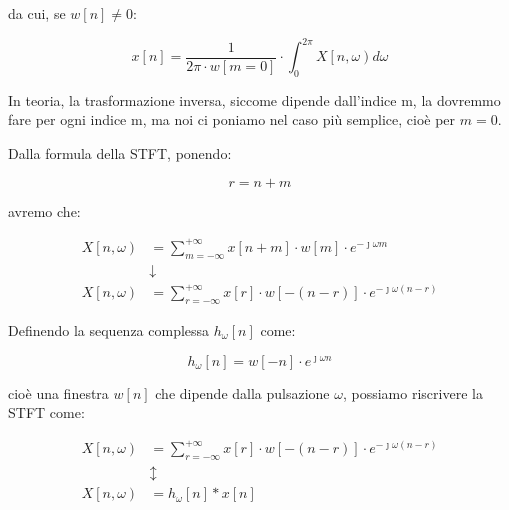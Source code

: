 da cui, se $w \left[ n\right] \neq 0$: 

{
    \Large 
    \begin{equation}
        x \left[ n\right]
        = 
        \dfrac{1}{2 \pi \cdot w \left[ m = 0\right]}
        \cdot 
        \int_{0}^{2 \pi}
        X \left[ n, \omega\right) d \omega
    \end{equation}
}

\begin{tcolorbox}
In teoria, la trasformazione inversa, siccome dipende dall'indice m, la dovremmo fare per ogni indice m, 
ma noi ci poniamo nel caso più semplice, cioè per $m = 0$.     
\end{tcolorbox}

Dalla formula della STFT, ponendo: 

{
    \Large 
    \begin{equation}
        r = n + m
    \end{equation}
}

avremo che: 

{
    \Large 
    \begin{equation}
        \begin{split}
        X \left[ n, \omega\right) 
        &= 
        \sum_{m = - \infty}^{+ \infty} x \left[ n + m\right] \cdot w \left[ m\right] \cdot e^{- \jmath \omega m}  
        \\
        &\downarrow
        \\
        X \left[ n, \omega\right) &= \sum_{r = - \infty}^{+ \infty} x \left[ r\right] \cdot w \left[ - \left( n - r\right)\right] \cdot e^{- \jmath \omega \left(n - r\right)}  
        \end{split}
    \end{equation}
}

Definendo la sequenza complessa $h_{\omega} \left[ n\right]$ come: 

{
    \Large 
    \begin{equation}
        h_{\omega} \left[ n\right] = w \left[ - n\right] \cdot e^{\jmath \omega n} 
    \end{equation}
}

cioè una finestra $w \left[ n\right]$ che dipende dalla pulsazione $\omega$, possiamo riscrivere la STFT come: 

{
    \Large 
    \begin{equation}
        \begin{split}
        X \left[ n, \omega\right) &= \sum_{r = - \infty}^{+ \infty} x \left[ r\right] \cdot w \left[ - \left( n - r\right)\right] \cdot e^{- \jmath \omega \left(n - r\right)}  
        \\
        &\updownarrow
        \\
        X \left[ n, \omega\right) &= h_{\omega} \left[ n\right] * x \left[ n\right]
        \end{split}
    \end{equation}
}

